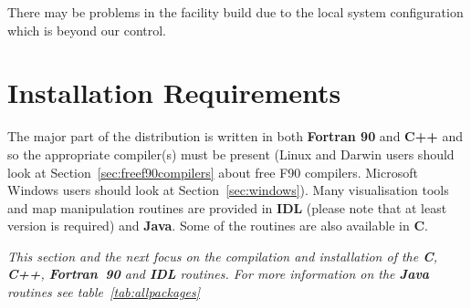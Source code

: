 \documentclass[12pt,twoside]{article}
\begin{document}
There may be problems in the facility build due to the local system 
configuration which is beyond our control. 

\section{Installation Requirements}
\label{sec:requirements}
The major part of the \healpix distribution is written in both \textbf{Fortran 90} and \textbf{C++} and
so the appropriate compiler(s) must be present (Linux and Darwin users should look
at Section~\ref{sec:freef90compilers} about free F90 compilers. Microsoft Windows
users should look at Section~\ref{sec:windows}). Many visualisation tools and map
manipulation routines are provided in \textbf{IDL} (please note 
that at least version \idlversion is required) and \textbf{Java}. Some of the \healpix routines are
also available in \textbf{C}.

{\em This section and the next focus on the compilation and installation of the
  \textbf{C}, \textbf{C++}, \textbf{Fortran~90}  and \textbf{IDL} routines. For more information on the 
\textbf{Java} routines see table~\ref{tab:allpackages}}
\end{document}
